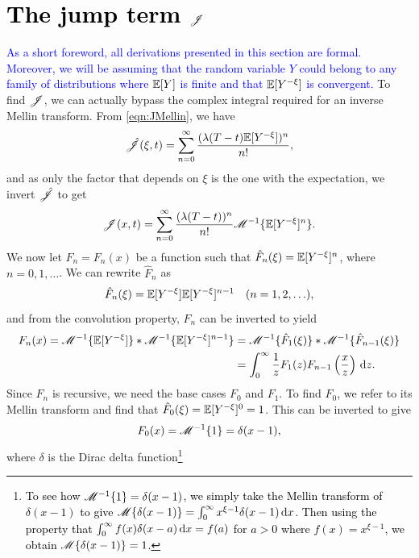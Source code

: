 \section{\textcolor{black}{The jump term $\mathscr J$}}
\textcolor{blue}{As a short foreword, all derivations presented in this section are formal. Moreover, we will be assuming that the random variable $Y$ could belong to any family of distributions where $\mathbb E[Y]$ is finite and that $\mathbb E[Y^{-\xi}]$ is convergent.} To find $\mathscr J$, we can actually bypass the complex integral required for an inverse Mellin transform. From \eqref{eqn:JMellin}, we have
	\begin{align*}
		\hat {\mathscr J}(\xi,t) = \displaystyle\sum\limits_{n=0}^{\infty} \frac{(\lambda(T-t)\mathbb E[Y^{-\xi}])^n}{n!},
	\end{align*}
and as only the factor that depends on $\xi$ is the one with the expectation, we invert $\hat {\mathscr J}$ to get
	\begin{equation}
		\label{eqn:Jhat}
		\mathscr J(x,t) = \displaystyle\sum\limits_{n=0}^{\infty} \frac{(\lambda(T-t))^n}{n!}\mathscr M^{-1}\{ \mathbb E[Y^{-\xi}]^n \}.
	\end{equation}
We now let $F_n = F_n(x)$ be a function such that $\hat F_n(\xi) = \mathbb E[Y^{-\xi}]^n$, where $ n = 0, 1, \ldots$. We can rewrite $\hat F_n$ as
	\begin{equation*}
		\hat F_n(\xi) = \mathbb E[Y^{-\xi}] \mathbb E[Y^{-\xi}]^{n-1} \quad (n = 1,2,\ldots),
	\end{equation*}
and from the convolution property, $\hat F_n$ can be inverted to yield
	\begin{align*}
		F_n(x) = \mathscr M^{-1} \{ \mathbb E[Y^{-\xi}] \} \ast \mathscr M^{-1} \{ \mathbb E[Y^{-\xi}]^{n-1} \} &= \mathscr M^{-1}\{ \hat F_1(\xi) \} \ast \mathscr M^{-1}\{ \hat F_{n-1}(\xi) \} \\
		&= \int_0^\infty \frac{1}{z} F_1(z)F_{n-1}\left( \frac{x}{z} \right) \, \mathrm d z.
	\end{align*}
Since $F_n$ is recursive, we need the base cases $F_0$ and $F_1$. To find $F_0$, we refer to its Mellin transform and find that $\hat F_0(\xi) = \mathbb E[Y^{-\xi}]^0 = 1$. This can be inverted to give
	\begin{equation*}
		F_0(x) = \mathscr M^{-1}\{ 1 \} = \delta(x-1),
	\end{equation*}
where $\delta$ is the Dirac delta function\footnote{\textcolor{black}{To see how $\mathscr M^{-1}\{1\} = \delta(x-1)$, we simply take the Mellin transform of $\delta(x-1)$ to give $\mathscr M\{\delta(x-1)\} = \int_0^\infty x^{\xi-1}\delta(x-1) \, \mathrm d x$. Then using the property that $\int_0^\infty f(x)\delta(x-a) \, \mathrm d x = f(a)$ for $a > 0$ where $f(x) = x^{\xi-1}$, we obtain $\mathscr M\{\delta(x-1)\} = 1$.}}
